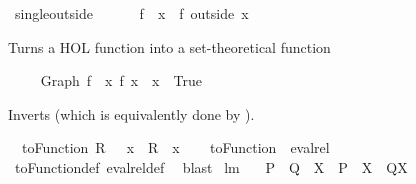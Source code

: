 \begin{isabellebody}
\begin{isamarkuptext}
\end{isamarkuptext}%
\isamarkuptrue%
\isamarkupfalse%
\ singleoutside\ {\isacharparenleft}\ {\isachardoublequoteopen}{\isacharminus}{\isacharminus}{\isachardoublequoteclose}\ {}{}{\isacharparenright}\isanewline
\ \ \ {\isachardoublequoteopen}f\ {\isacharminus}{\isacharminus}\ x\ {\isasymequiv}\ f\ outside\ {\isacharbraceleft}x{\isacharbraceright}{\isachardoublequoteclose}%
\begin{isamarkuptext}%
Turns a HOL function into a set-theoretical function%
\end{isamarkuptext}%
\isamarkuptrue%
\isamarkupfalse%
\ \ \isanewline
\ \ {\isachardoublequoteopen}Graph\ f\ {\isacharequal}\ {\isacharbraceleft}{\isacharparenleft}x{\isacharcomma}\ f\ x{\isacharparenright}\ {\isacharbar}\ x\ {\isachardot}\ True{\isacharbraceright}{\isachardoublequoteclose}%
\begin{isamarkuptext}%
Inverts  (which is equivalently done by ).%
\end{isamarkuptext}%
\isamarkuptrue%
\isamarkupfalse%
\isanewline
\ \ {\isachardoublequoteopen}toFunction\ R\ {\isacharequal}\ {\isacharparenleft}{\isasymlambda}\ x\ {\isachardot}\ {\isacharparenleft}R\ {\isacharcomma}{\isacharcomma}\ x{\isacharparenright}{\isacharparenright}{\isachardoublequoteclose}\isanewline
\isanewline
\isanewline
{}\isamarkupfalse%
\ \isanewline
\ \ {\isachardoublequoteopen}toFunction\ {\isacharequal}\ eval{\isacharunderscore}rel{\isachardoublequoteclose}\ \isanewline
%
\isadelimproof
\ \ %
\endisadelimproof
%
\isatagproof
{}\isamarkupfalse%
\ toFunction{\isacharunderscore}def\ eval{\isacharunderscore}rel{\isacharunderscore}def\ \isamarkupfalse%
\ blast%
\endisatagproof
{\isafoldproof}%
%
\isadelimproof
\isanewline
%
\endisadelimproof
\isanewline
{}\isamarkupfalse%
\ lm{}{}{}{\isacharcolon}\ \isanewline
\ \ {\isachardoublequoteopen}{\isacharparenleft}{\isacharparenleft}P\ {\isasymunion}\ Q{\isacharparenright}\ {\isacharbar}{\isacharbar}\ X{\isacharparenright}\ {\isacharequal}\ {\isacharparenleft}{\isacharparenleft}P\ {\isacharbar}{\isacharbar}\ X{\isacharparenright}\ {\isasymunion}\ {\isacharparenleft}Q{\isacharbar}{\isacharbar}X{\isacharparenright}{\isacharparenright}{\isachardoublequoteclose}\ \isanewline
%
\isadelimproof
\ \ %
\endisadelimproof
%
\isatagproof

\end{isabellebody}
